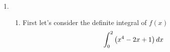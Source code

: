 \documentclass[12pt]{article}
\begin{document}
\maketitle

\begin{enumerate}[leftmargin=*]

\item %

\begin{enumerate}
	\item First let's consider the definite integral of \(f(x)\)
	\begin{equation*}
	\int_0^2\left(x^4 - 2x +1 \right)dx\\
	\end{equation*}
\end{enumerate}

\end{enumerate}
\end{document}
